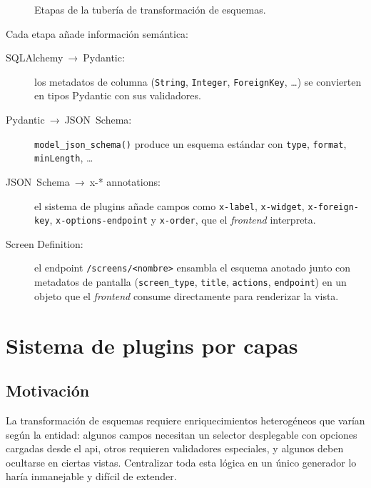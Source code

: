 \begin{figure}[H]
  \centering
  \caption{Etapas de la tubería de transformación de esquemas.}
  \label{fig:pipeline}
\end{figure}

Cada etapa añade información semántica:

\begin{description}
  \item[SQLAlchemy~→~Pydantic:] los metadatos de columna (\texttt{String}, \texttt{Integer},
    \texttt{ForeignKey}, \ldots) se convierten en tipos Pydantic con sus validadores.
  \item[Pydantic~→~JSON~Schema:] \texttt{model\_json\_schema()} produce un esquema estándar
    con \texttt{type}, \texttt{format}, \texttt{minLength}, \ldots
  \item[JSON~Schema~→~x-* annotations:] el sistema de plugins añade campos como
    \texttt{x-label}, \texttt{x-widget}, \texttt{x-foreign-key}, \texttt{x-options-endpoint}
    y \texttt{x-order}, que el \textit{frontend} interpreta.
  \item[Screen Definition:] el endpoint \texttt{/screens/<nombre>} ensambla el esquema
    anotado junto con metadatos de pantalla (\texttt{screen\_type}, \texttt{title},
    \texttt{actions}, \texttt{endpoint}) en un objeto que el \textit{frontend} consume
    directamente para renderizar la vista.
\end{description}

\section{Sistema de plugins por capas}
\label{sec:plugins}

\subsection{Motivación}
\label{subsec:plugins-motivacion}

La transformación de esquemas requiere enriquecimientos heterogéneos que varían según la
entidad: algunos campos necesitan un selector desplegable con opciones cargadas desde el
\gls{api}, otros requieren validadores especiales, y algunos deben ocultarse en ciertas
vistas. Centralizar toda esta lógica en un único generador lo haría inmanejable y difícil
de extender.

